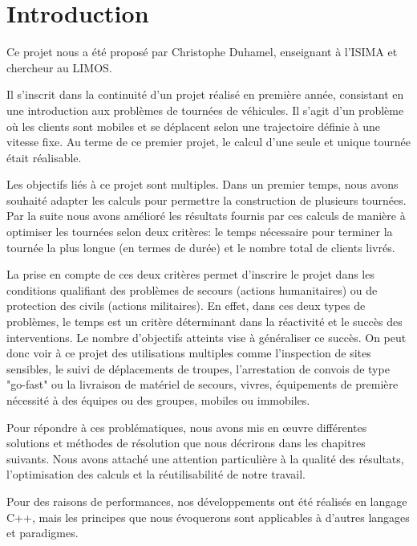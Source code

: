 \chapter*{Introduction}

Ce projet nous a été proposé par Christophe Duhamel, enseignant à l’ISIMA et chercheur au LIMOS.

Il s'inscrit dans la continuité d'un projet réalisé en première année, consistant en une introduction aux problèmes de tournées de véhicules.
Il s'agit d'un problème où les clients sont mobiles et se déplacent selon une trajectoire définie à une vitesse fixe. Au terme de ce premier projet, le calcul d'une seule et unique tournée était réalisable.

Les objectifs liés à ce projet sont multiples. Dans un premier temps, nous avons souhaité adapter les calculs pour permettre la construction de plusieurs tournées. Par la suite nous avons amélioré les résultats fournis par ces calculs de manière à optimiser les tournées selon deux critères: le temps nécessaire pour terminer la tournée la plus longue (en termes de durée) et le nombre total de clients livrés.

La prise en compte de ces deux critères permet d'inscrire le projet dans les conditions qualifiant des problèmes de secours (actions humanitaires) ou de protection des civils (actions militaires). En effet, dans ces deux types de problèmes, le temps est un critère déterminant dans la réactivité et le succès des interventions. Le nombre d'objectifs atteints vise à généraliser ce succès. On peut donc voir à ce projet des utilisations multiples comme l'inspection de sites sensibles, le suivi de déplacements de troupes, l'arrestation de convois de type "go-fast" ou la livraison de matériel de secours, vivres, équipements de première nécessité à des équipes ou des groupes, mobiles ou immobiles.

Pour répondre à ces problématiques, nous avons mis en \oe uvre différentes solutions et méthodes de résolution que nous décrirons dans les chapitres suivants. Nous avons attaché une attention particulière à la qualité des résultats, l'optimisation des calculs et la réutilisabilité de notre travail.

Pour des raisons de performances, nos développements ont été réalisés en langage C++, mais les principes que nous évoquerons sont applicables à d'autres langages et paradigmes.